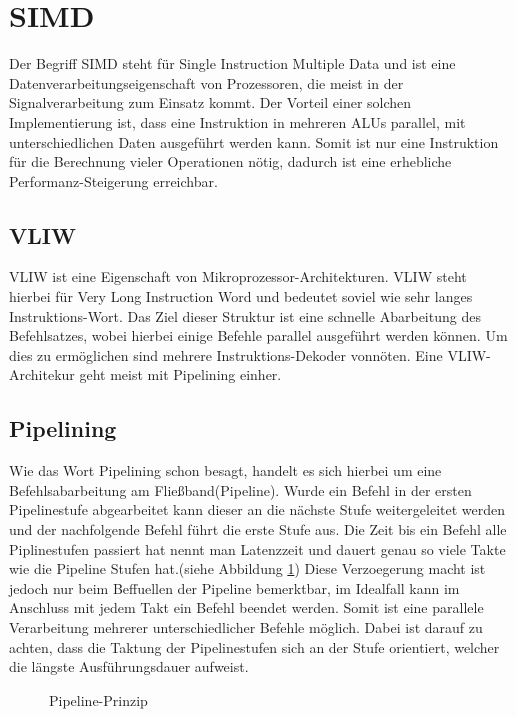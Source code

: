 \section{SIMD}
\label{sec:SIMD}
Der Begriff SIMD steht für Single Instruction Multiple Data und ist eine Datenverarbeitungseigenschaft von Prozessoren, die meist in der Signalverarbeitung zum Einsatz kommt. Der Vorteil einer solchen Implementierung ist, dass eine Instruktion in mehreren ALUs parallel, mit unterschiedlichen Daten ausgeführt werden kann. Somit ist nur eine Instruktion für die Berechnung vieler Operationen nötig, dadurch ist eine erhebliche Performanz-Steigerung erreichbar.\cite[Seite 249]{wust2010mikroprozessortechnik}

\subsection{VLIW}
\label{sec:VLIW}
VLIW ist eine Eigenschaft von Mikroprozessor-Architekturen. VLIW steht hierbei für Very Long Instruction Word und bedeutet soviel wie sehr langes Instruktions-Wort. Das Ziel dieser Struktur ist eine schnelle Abarbeitung des Befehlsatzes, wobei hierbei einige Befehle parallel ausgeführt werden können. Um dies zu ermöglichen sind mehrere Instruktions-Dekoder vonnöten. Eine VLIW-Architekur geht meist mit Pipelining einher. 

\subsection{Pipelining}
Wie das Wort Pipelining schon besagt, handelt es sich hierbei um eine Befehlsabarbeitung am Fließband(Pipeline). Wurde ein Befehl in der ersten Pipelinestufe abgearbeitet kann dieser an die nächste Stufe weitergeleitet werden und der nachfolgende Befehl führt die erste Stufe aus. Die Zeit bis ein Befehl alle Piplinestufen passiert hat nennt man Latenzzeit und dauert genau so viele Takte wie die Pipeline Stufen hat.(siehe Abbildung \ref{fig:pipeline}) Diese Verzoegerung macht ist jedoch nur beim Beffuellen der Pipeline bemerktbar, im Idealfall kann im Anschluss mit jedem Takt ein Befehl beendet werden. Somit ist eine parallele Verarbeitung mehrerer unterschiedlicher Befehle möglich. Dabei ist darauf zu achten, dass die Taktung der Pipelinestufen sich an der Stufe orientiert, welcher die längste Ausführungsdauer aufweist. \cite[Seite 204]{wust2010mikroprozessortechnik}
\begin{scriptsize}
	\begin{figure}[htbp] 
		\centering
		
		\caption{Pipeline-Prinzip}
		\label{fig:pipeline}
	\end{figure}
\end{scriptsize}

